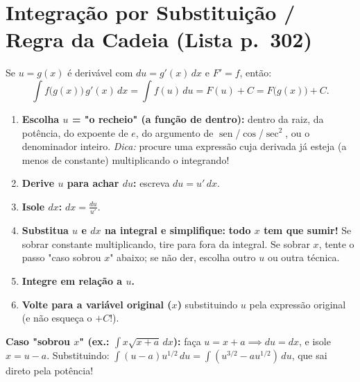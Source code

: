 \documentclass[10pt,a4paper]{article}
\DeclareMathOperator{\sen}{sen}
\begin{document}
\section{Integração por Substituição / Regra da Cadeia (Lista p.\ 302)}

\begin{teo}
    Se $u = g(x)$ é derivável com $du = g'(x)\,dx$ e $F' = f$, então:
    \[
        \int f\big(g(x)\big)\,g'(x)\,dx = \int f(u)\,du = F(u) + C = F\big(g(x)\big) + C.
    \]
\end{teo}

\begin{dica}
    \begin{enumerate}
        \item \textbf{Escolha $u$ = "o recheio" (a função de dentro):} dentro da raiz, da potência, do expoente de $e$, do argumento de $\sen$/$\cos$/$\sec^2$, ou o denominador inteiro. \emph{Dica:} procure uma expressão cuja derivada já esteja (a menos de constante) multiplicando o integrando!
        \item \textbf{Derive $u$ para achar $du$:} escreva $\displaystyle du = u'\,dx$.
        \item \textbf{Isole $dx$:} $\displaystyle dx = \frac{du}{u'}$.
        \item \textbf{Substitua $u$ e $dx$ na integral e simplifique:} \textbf{todo $x$ tem que sumir!} Se sobrar constante multiplicando, tire para fora da integral. Se sobrar $x$, tente o passo "caso sobrou $x$" abaixo; se não der, escolha outro $u$ ou outra técnica.
        \item \textbf{Integre em relação a $u$.}
        \item \textbf{Volte para a variável original ($x$)} substituindo $u$ pela expressão original (e não esqueça o $+C$!).
    \end{enumerate}
    \textbf{Caso "sobrou $x$" (ex.: $\int x\sqrt{x+a}\,dx$):} faça $u = x+a \implies du = dx$, e isole $x = u - a$. Substituindo: $\int (u-a)u^{1/2}\,du = \int (u^{3/2} - a u^{1/2})\,du$, que sai direto pela potência!
\end{dica}
\end{document}
